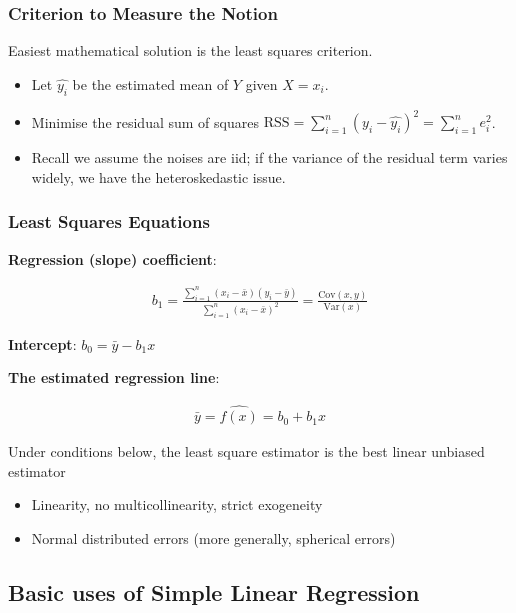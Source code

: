 \subsubsection{Criterion to Measure the Notion}

\indent 

Easiest mathematical solution is the least squares criterion.

\begin{itemize}
    \item Let $\hat{y_i}$ be the estimated mean of $Y$ given $X=x_i$.
    \item Minimise the residual sum of squares $\text{RSS} = \sum_{i=1}^{n}(y_i - \hat{y_i})^2 = \sum_{i=1}^{n}e_i^2$.
    \item Recall we assume the noises are iid; if the variance of the residual term varies widely, we have the heteroskedastic issue.
\end{itemize}

\subsubsection{Least Squares Equations}

\noindent\textbf{Regression (slope) coefficient}:

\begin{align*}
    b_1 = \frac{\sum_{i=1}^{n}(x_i - \bar{x})(y_i - \bar{y})}{\sum_{i=1}^{n}(x_i-\bar{x})^2} = \frac{\text{Cov}(x,y)}{\text{Var}(x)}
\end{align*}

\noindent\textbf{Intercept}: $b_0 = \bar{y}-b_1 x$

\noindent\textbf{The estimated regression line}:

\begin{align*}
    \bar{y} = \widehat{f(x)} = b_0 + b_1 x
\end{align*}

Under conditions below, the least square estimator is the best linear unbiased estimator

\begin{itemize}
    \item Linearity, no multicollinearity, strict exogeneity
    \item Normal distributed errors (more generally, spherical errors)
\end{itemize}

\subsection{Basic uses of Simple Linear Regression}


